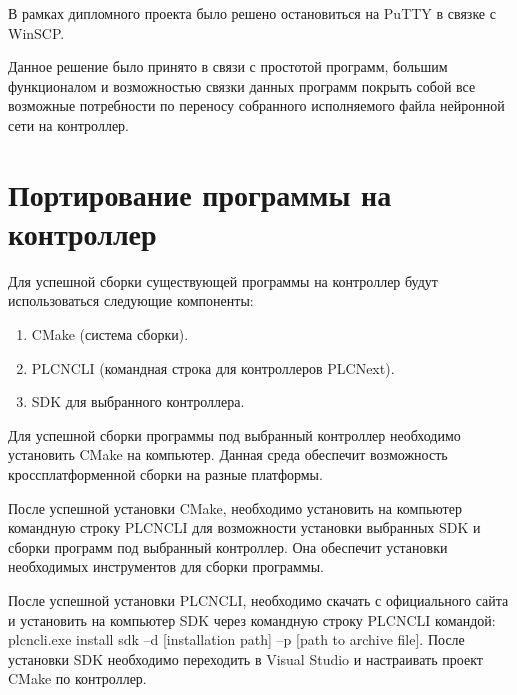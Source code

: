 В рамках дипломного проекта было решено остановиться на PuTTY в связке с WinSCP. 

Данное решение было принято в связи с простотой программ, большим функционалом и возможностью связки данных программ покрыть собой все возможные потребности по переносу собранного исполняемого файла нейронной сети на контроллер.

\section{Портирование программы на контроллер}

Для успешной сборки существующей программы на контроллер будут использоваться следующие компоненты:

\begin{enumerate}
	\item CMake (система сборки).
	\item PLCNCLI (командная строка для контроллеров PLCNext).
	\item SDK для выбранного контроллера.	
\end{enumerate}

Для успешной сборки программы под выбранный контроллер необходимо установить CMake на компьютер. Данная среда обеспечит возможность кроссплатформенной сборки на разные платформы.

После успешной установки CMake, необходимо установить на компьютер командную строку PLCNCLI для возможности установки выбранных SDK и сборки программ под выбранный контроллер. Она обеспечит установки необходимых инструментов для сборки программы.

После успешной установки PLCNCLI, необходимо скачать с официального сайта и установить на компьютер SDK через командную строку PLCNCLI командой: plcncli.exe install sdk –d [installation path] –p [path to archive file].  После установки SDK необходимо переходить в Visual Studio и настраивать проект CMake по контроллер.
	